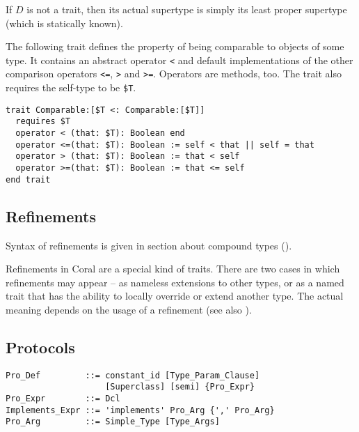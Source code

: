 If $D$ is not a trait, then its actual supertype is simply its least proper supertype (which is statically known). 

\example The following trait defines the property of being comparable to objects of some type. It contains an abstract operator \lstinline!<! and default implementations of the other comparison operators \lstinline!<=!, \lstinline!>! and \lstinline!>=!. Operators are methods, too. The trait also requires the self-type to be \lstinline[mathescape=false]!$T!. 
\begin{lstlisting}[mathescape=false]
trait Comparable:[$T <: Comparable:[$T]]
  requires $T
  operator < (that: $T): Boolean end
  operator <=(that: $T): Boolean := self < that || self = that
  operator > (that: $T): Boolean := that < self
  operator >=(that: $T): Boolean := that <= self
end trait
\end{lstlisting}

\subsection{Refinements}
\label{sec:refinements}

Syntax of refinements is given in section about compound types (). 

Refinements in Coral are a special kind of traits. There are two cases in which refinements may appear -- as nameless extensions to other types, or as a named trait that has the ability to locally override or extend another type. The actual meaning depends on the usage of a refinement (see also ).


\subsection{Protocols}
\label{sec:protocols}

\syntax\begin{lstlisting}
Pro_Def         ::= constant_id [Type_Param_Clause]
                    [Superclass] [semi] {Pro_Expr}
Pro_Expr        ::= Dcl
Implements_Expr ::= 'implements' Pro_Arg {',' Pro_Arg}
Pro_Arg         ::= Simple_Type [Type_Args]
\end{lstlisting}


